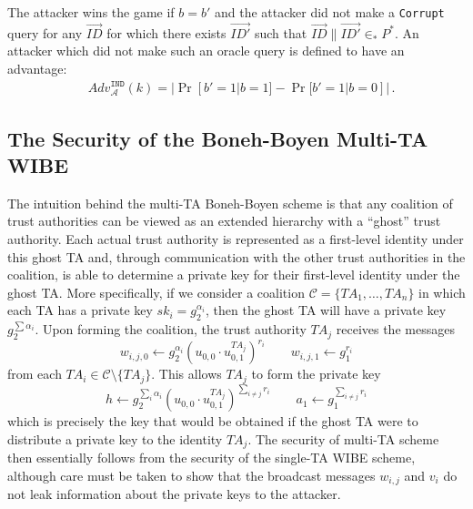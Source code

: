\documentclass[10pt]{llncs}
\newcommand{\A}{\mathcal{A}}
\newcommand{\C}{\mathcal{C}}
\newcommand{\ID}{\mathit{ID}}
\newcommand{\TA}{\mathit{TA}}
\newcommand{\sk}{\mathit{sk}}
\newcommand{\adv}[2]{\mathit{Adv}_{#1}^{\texttt{#2}}}
\begin{document}
The attacker wins the game if $b=b'$ and the attacker did not make a
\texttt{Corrupt} query for any $\vec{\ID}$ for which there
exists $\vec{\ID'}$ such that $\vec{\ID}\|\vec{\ID'} \in_{*} P^{*}$.
An attacker which did not make such an oracle query is defined to
have an advantage:
\begin{eqnarray*}
    & \adv{\A}{IND}(k) = |\Pr[b'=1|b=1]-\Pr[b'=1|b=0]| \, .
\end{eqnarray*}

\subsection{The Security of the Boneh-Boyen Multi-TA WIBE}

The intuition behind the multi-TA Boneh-Boyen scheme is that any
coalition of trust authorities can be viewed as an extended
hierarchy with a ``ghost'' trust authority. Each actual trust
authority is represented as a first-level identity under this ghost
TA and, through communication with the other trust authorities in
the coalition, is able to determine a private key for their
first-level identity under the ghost TA. More specifically, if we
consider a coalition $\C = \{ \TA_{1},\ldots,\TA_{n}\}$ in which
each TA has a private key $\sk_{i} = g_{2}^{\alpha_{i}}$, then the
ghost TA will have a private key $g_{2}^{\sum \alpha_{i}}$. Upon
forming the coalition, the trust authority $\TA_{j}$ receives the
messages
\begin{displaymath}
w_{i,j,0} \gets g_{2}^{\alpha_{i}} (u_{0,0} \cdot
u_{0,1}^{\TA_{j}})^{r_{i}} \qquad w_{i,j,1} \gets g_{1}^{r_{i}}
\end{displaymath}
from each $\TA_{i} \in \C \setminus \{TA_{j}\}$. This allows
$\TA_{j}$ to form the private key
\begin{displaymath}
h \gets g_{2}^{\sum_{i} \alpha_{i}} (u_{0,0} \cdot
u_{0,1}^{\TA_{j}})^{\sum_{i\neq j} r_{i}} \qquad a_{1} \gets
g_{1}^{\sum_{i\neq j} r_{i}}
\end{displaymath}
which is precisely the key that would be obtained if the ghost TA
were to distribute a private key to the identity $\TA_{j}$. The
security of multi-TA scheme then essentially follows from the
security of the single-TA WIBE scheme, although care must be taken
to show that the broadcast messages $w_{i,j}$ and $v_{i}$ do not
leak information about the private keys to the attacker.
\end{document}
